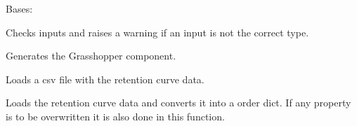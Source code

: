 \documentclass[letterpaper,10pt,english]{sphinxmanual}
\begin{document}

\begin{fulllineitems}
\label{\detokenize{cmf:livestock.components.comp_cmf.CMFRetentionCurve}}
Bases: {\hyperref[\detokenize{superclass:livestock.components.component.GHComponent}]{}}

\begin{fulllineitems}
\label{\detokenize{cmf:livestock.components.comp_cmf.CMFRetentionCurve.check_inputs}}
Checks inputs and raises a warning if an input is not the correct type.

\end{fulllineitems}


\begin{fulllineitems}
\label{\detokenize{cmf:livestock.components.comp_cmf.CMFRetentionCurve.config}}
Generates the Grasshopper component.

\end{fulllineitems}


\begin{fulllineitems}
\label{\detokenize{cmf:livestock.components.comp_cmf.CMFRetentionCurve.load_csv}}
Loads a csv file with the retention curve data.

\end{fulllineitems}


\begin{fulllineitems}
\label{\detokenize{cmf:livestock.components.comp_cmf.CMFRetentionCurve.load_retention_curve}}
Loads the retention curve data and converts it into a order dict.
If any property is to be overwritten it is also done in this function.


\end{fulllineitems}
\end{fulllineitems}
\end{document}
